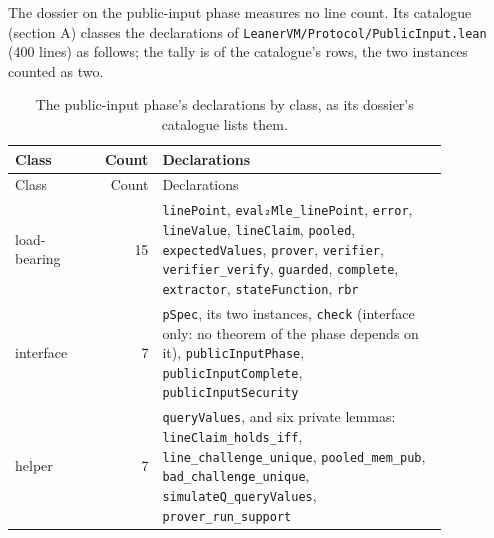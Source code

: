The dossier on the public-input phase measures no line count. Its catalogue (section A) classes the declarations of \texttt{L\allowbreak{}e\allowbreak{}a\allowbreak{}n\allowbreak{}e\allowbreak{}r\allowbreak{}V\allowbreak{}M\allowbreak{}/\allowbreak{}P\allowbreak{}r\allowbreak{}o\allowbreak{}t\allowbreak{}o\allowbreak{}c\allowbreak{}o\allowbreak{}l\allowbreak{}/\allowbreak{}P\allowbreak{}u\allowbreak{}b\allowbreak{}l\allowbreak{}i\allowbreak{}c\allowbreak{}I\allowbreak{}n\allowbreak{}p\allowbreak{}u\allowbreak{}t\allowbreak{}.\allowbreak{}l\allowbreak{}e\allowbreak{}a\allowbreak{}n} (400 lines) as follows; the tally is of the catalogue's rows, the two instances counted as two.

{\footnotesize
\begin{longtable}{@{}>{\raggedright\arraybackslash}p{0.2\linewidth}r>{\raggedright\arraybackslash}p{0.66\linewidth}@{}}
\caption{The public-input phase's declarations by class, as its dossier's catalogue lists them.}\label{tab:gen-surface-pubinput}\\
\toprule
Class & Count & Declarations \\
\midrule
\endfirsthead
\toprule
Class & Count & Declarations \\
\midrule
\endhead
\bottomrule
\endfoot
load-bearing & 15 & \texttt{linePoint}, \texttt{eval₂Mle\_\allowbreak{}linePoint}, \texttt{error}, \texttt{lineValue}, \texttt{lineClaim}, \texttt{pooled}, \texttt{expectedValues}, \texttt{prover}, \texttt{verifier}, \texttt{verifier\_\allowbreak{}verify}, \texttt{guarded}, \texttt{complete}, \texttt{extractor}, \texttt{stateFunction}, \texttt{rbr} \\
interface & 7 & \texttt{pSpec}, its two instances, \texttt{check} (interface only: no theorem of the phase depends on it), \texttt{publicInputPhase}, \texttt{publicInputComplete}, \texttt{publicInputSecurity} \\
helper & 7 & \texttt{queryValues}, and six private lemmas: \texttt{lineClaim\_\allowbreak{}holds\_\allowbreak{}iff}, \texttt{line\_\allowbreak{}challenge\_\allowbreak{}unique}, \texttt{pooled\_\allowbreak{}mem\_\allowbreak{}pub}, \texttt{bad\_\allowbreak{}challenge\_\allowbreak{}unique}, \texttt{simulateQ\_\allowbreak{}queryValues}, \texttt{prover\_\allowbreak{}run\_\allowbreak{}support} \\

\end{longtable}}
